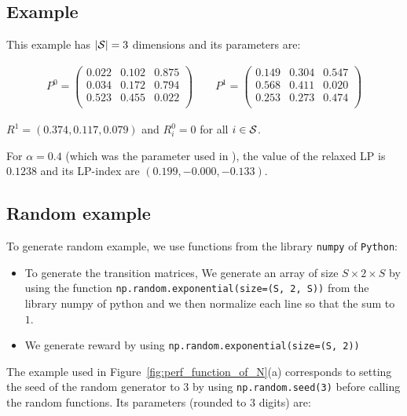 \subsection{Example \cite{chen:tel-04068056}}

This example has $|\mathcal{S}|=3$ dimensions and its parameters are:

\begin{align*}
    P^{ 0 }=\left(
    \begin{array}{ccc}
       0.022 &0.102 &0.875 \\
       0.034 &0.172 &0.794 \\
       0.523 &0.455 &0.022 \\
    \end{array}\right)\qquad 
    P^{ 1 }=\left(
    \begin{array}{ccc}
       0.149 &0.304 &0.547 \\
       0.568 &0.411 &0.020 \\
       0.253 &0.273 &0.474 \\
    \end{array}\right)
\end{align*}

$R^{ 1 } = ( 0.374, 0.117, 0.079) $ and $R^0_i=0$ for all $i\in\mathcal{S}$. 

For $\alpha=0.4$ (which was the parameter used in \cite{chen:tel-04068056}), the value of the relaxed LP is $0.1238$ and its LP-index are $(0.199 , -0.000 , -0.133)$.


\subsection{Random example}

To generate random example, we use functions from the library \texttt{numpy} of \texttt{Python}: 
\begin{itemize}
    \item To generate the transition matrices, We generate an array of size $S\times2\times S$ by using the function \texttt{np.random.exponential(size=(S, 2, S))} from the library numpy of python and we then normalize each line so that the sum to $1$. 
    \item We generate reward by using \texttt{np.random.exponential(size=(S, 2))}
\end{itemize}
The example used in Figure~\ref{fig:perf_function_of_N}(a) corresponds to setting the seed of the random generator to $3$ by using \texttt{np.random.seed(3)} before calling the random functions. Its parameters (rounded to $3$ digits) are:

